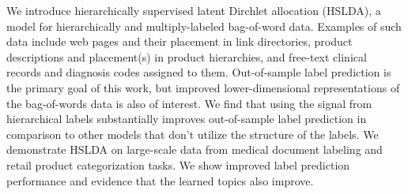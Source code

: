 We introduce hierarchically supervised latent Dirchlet allocation (HSLDA), a model for hierarchically and multiply-labeled bag-of-word data.  Examples of such data include web pages and their placement in link directories, product descriptions and placement(s) in product hierarchies, and free-text clinical records and diagnosis codes assigned to them.
Out-of-sample label prediction is the primary goal of this work, but
improved lower-dimensional representations of the bag-of-words data is also of interest.  
We find that using the signal from hierarchical labels substantially improves out-of-sample label prediction in comparison to other models that don't utilize the structure of the labels.   We demonstrate HSLDA on large-scale data from medical document labeling and retail product categorization tasks.  We show improved label prediction performance and evidence that the learned topics also improve.  


